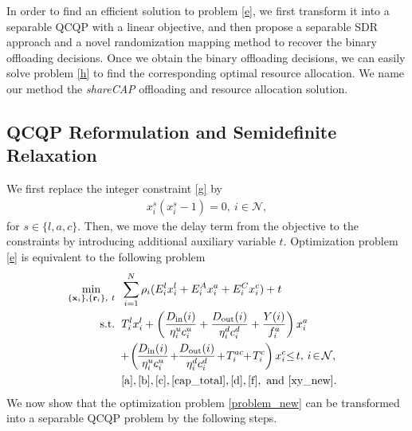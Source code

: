 \documentclass[10pt,journal,compsoc]{IEEEtran}
\begin{document}
In order to find an efficient solution to problem \eqref{e}, we
first transform it into a separable QCQP with a linear objective,
and then propose a separable SDR approach and a novel randomization
mapping method to recover the binary offloading decisions. Once we
obtain the binary offloading decisions, we can easily solve problem
\eqref{h} to find the corresponding optimal resource allocation. We
name our method the
\textit{shareCAP} offloading and resource allocation solution. %
\subsection{QCQP Reformulation and Semidefinite Relaxation}\label{sec_SDR_no_delay}
We first replace the integer constraint \eqref{g} by
\begin{align} \label{xy_new}
x^s_{i}(x^s_{i}-1)=0,\ i\in\mathcal{N},
\end{align}
for $s \in \{l,a,c\}$. Then, we move the delay term from the
objective to the constraints by introducing additional auxiliary
variable $t$. Optimization problem \eqref{e} is equivalent to the
following problem
\begin{align}\hspace*{-0.3cm}
\min\limits_{\{ \mathbf{x}_i \}, \{ \mathbf{r}_i \},\ t}
&\quad \hspace*{-0.15cm}\sum_{i=1}^N\rho_i(E^l_{i}x^l_{i}+E^A_ix^a_{i}+E^C_ix^c_{i})+t\label{problem_new}\allowdisplaybreaks\\
\text{s.t.}
&\quad \hspace*{-0.15cm}T^l_{i}x^l_{i}+\left(\frac{D_{{\textrm{in}}}(i)}{\eta^u_ic^u_{i}}+\frac{D_{{\textrm{out}}}(i)}{\eta^d_ic^d_{i}}+\frac{Y(i)}{f^a_i}\right)x^a_{i}\nonumber\allowdisplaybreaks\\
&\quad \hspace*{-0.25cm}+\hspace*{-0.05cm}\left(\hspace*{-0.05cm}\frac{D_{{\textrm{in}}}(i)}{\eta^u_ic^u_{i}}\hspace*{-0.05cm}+\hspace*{-0.1cm}\frac{D_{{\textrm{out}}}(i)}{\eta^d_ic^d_{i}}\hspace*{-0.05cm}+\hspace*{-0.05cm}T^{ac}_i\hspace*{-0.1cm}+\hspace*{-0.05cm}T^{c}_i\right)x^c_{i}\hspace*{-0.1cm}\leq \hspace*{-0.05cm}t,\  \hspace*{-0.05cm}i\hspace*{-0.05cm}\in\hspace*{-0.05cm}\mathcal{N},\hspace*{-0.05cm}\label{problem_new.a}\allowdisplaybreaks\\
&\quad
\hspace*{-0.15cm}\eqref{a},\eqref{b},\eqref{c},\eqref{cap_total},\eqref{d},\eqref{f},\
\mathrm{and}\ \eqref{xy_new}.\nonumber
\end{align}
We now show that the optimization problem \eqref{problem_new} can be
transformed into a separable QCQP problem by the following steps.
\end{document}
